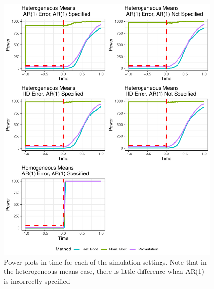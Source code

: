 \documentclass{article}
\begin{document}
\begin{figure}
\centering
\includegraphics[scale=1]{full_power_25.pdf}
\caption{Power plots in time for each of the simulation settings. Note that in the heterogeneous means case, there is little difference when AR(1) is incorrectly specified}
\label{fig:time_power_plot_full}
\end{figure}
\end{document}

